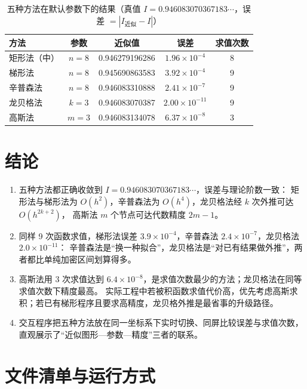 \documentclass[12pt,a4paper]{ctexart}
\begin{document}
\begin{table}[H]
    \centering
    \caption{五种方法在默认参数下的结果（真值 $I=0.946083070367183\cdots$，误差 $=|I_{\text{近似}}-I|$）}
    \label{tab:compare}
    \begin{tabular}{lcccc}
        \toprule
        方法 & 参数 & 近似值 & 误差 & 求值次数 \\
        \midrule
        矩形法（中） & $n=8$ & 0.946279196286 & $1.96\times10^{-4}$  & 8 \\
        梯形法       & $n=8$ & 0.945690863583 & $3.92\times10^{-4}$  & 9 \\
        辛普森法     & $n=8$ & 0.946083310888 & $2.41\times10^{-7}$  & 9 \\
        龙贝格法     & $k=3$ & 0.946083070387 & $2.00\times10^{-11}$ & 9 \\
        高斯法       & $m=3$ & 0.946083134078 & $6.37\times10^{-8}$  & 3 \\
        \bottomrule
    \end{tabular}
\end{table}

\section{结论}\label{sec:conclusion}

\begin{enumerate}
    \item 五种方法都正确收敛到 $I=0.946083070367183\cdots$，误差与理论阶数一致：
        矩形法与梯形法为 $O(h^2)$，辛普森法为 $O(h^4)$，龙贝格法经 $k$ 次外推可达 $O(h^{2k+2})$，
        高斯法 $m$ 个节点可达代数精度 $2m-1$。
    \item 同样 9 次函数求值，梯形法误差 $3.9\times10^{-4}$，辛普森法 $2.4\times10^{-7}$，龙贝格法 $2.0\times10^{-11}$：
        辛普森法是“换一种拟合”，龙贝格法是“对已有结果做外推”，两者都比单纯加密区间划算得多。
    \item 高斯法用 3 次求值达到 $6.4\times10^{-8}$，是求值次数最少的方法；龙贝格法在同等求值次数下精度最高。
        实际工程中若被积函数求值代价高，优先考虑高斯求积；若已有梯形程序且要求高精度，龙贝格外推是最省事的升级路径。
    \item 交互程序把五种方法放在同一坐标系下实时切换、同屏比较误差与求值次数，
        直观展示了“近似图形—参数—精度”三者的联系。
\end{enumerate}

\appendix
\section{文件清单与运行方式}
\end{document}
